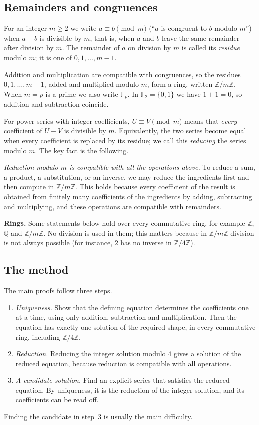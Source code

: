 \documentclass[11pt,a4paper]{article}
\theoremstyle{definition}
\theoremstyle{remark}
\newcommand{\Z}{\mathbb{Z}}
\newcommand{\Q}{\mathbb{Q}}
\newcommand{\F}{\mathbb{F}}
\newcommand{\para}[1]{\par\medskip\noindent\textbf{#1}\enspace}
\begin{document}
\subsection{Remainders and congruences}
For an integer $m\ge2$ we write $a\equiv b\pmod m$ (``$a$ is congruent to $b$ modulo $m$'') when $a-b$ is divisible by
$m$, that is, when $a$ and $b$ leave the same remainder after division by $m$. The remainder of $a$ on division by
$m$ is called its \emph{residue} modulo $m$; it is one of $0,1,\dots,m-1$.

Addition and multiplication are compatible with congruences, so the residues $0,1,\dots,m-1$, added and multiplied
modulo $m$, form a ring, written $\Z/m\Z$. When $m=p$ is a prime we also write $\F_p$. In $\F_2=\{0,1\}$ we have $1+1=0$,
so addition and subtraction coincide.

For power series with integer coefficients, $U\equiv V\pmod m$ means that \emph{every} coefficient of $U-V$ is
divisible by $m$. Equivalently, the two series become equal when every coefficient is replaced by its residue; we call
this \emph{reducing} the series modulo $m$. The key fact is the following.

\emph{Reduction modulo $m$ is compatible with all the operations above.} To reduce a sum, a product, a substitution, or
an inverse, we may reduce the ingredients first and then compute in $\Z/m\Z$. This holds because every
coefficient of the result is obtained from finitely many coefficients of the ingredients by adding, subtracting and
multiplying, and these operations are compatible with remainders.

\para{Rings.} Some statements below hold over every commutative ring, for example $\Z$, $\Q$ and $\Z/m\Z$. No
division is used in them; this matters because in $\Z/m\Z$ division is not always possible (for instance, $2$ has no inverse in
$\Z/4\Z$).

\subsection{The method}
The main proofs follow three steps.
\begin{enumerate}
\item \emph{Uniqueness.} Show that the defining equation determines the coefficients one at a time, using only
addition, subtraction and multiplication. Then the equation has exactly one solution of the required shape, in every
commutative ring, including $\Z/4\Z$.
\item \emph{Reduction.} Reducing the integer solution modulo $4$ gives a solution of the reduced equation,
because reduction is compatible with all operations.
\item \emph{A candidate solution.} Find an explicit series that satisfies the reduced equation. By uniqueness, it is
the reduction of the integer solution, and its coefficients can be read off.
\end{enumerate}
Finding the candidate in step~3 is usually the main difficulty.
\end{document}
